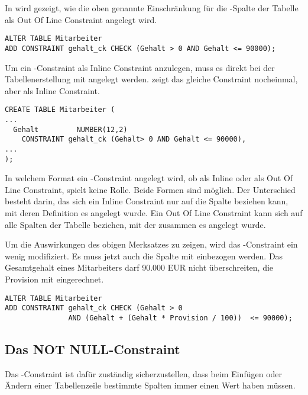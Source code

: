In  wird gezeigt, wie die oben genannte
Einschränkung für die -Spalte der Tabelle
 als Out Of Line Constraint angelegt wird.
\begin{lstlisting}[language=oracle_sql,caption={Ein \CHECK-Constraint als Out Of Line Constraint},label=sql09_02]
ALTER TABLE Mitarbeiter
ADD CONSTRAINT gehalt_ck CHECK (Gehalt > 0 AND Gehalt <= 90000);
        \end{lstlisting}
Um ein \CHECK-Constraint als Inline Constraint anzulegen, muss es direkt bei der Tabellenerstellung mit angelegt werden.  zeigt das gleiche Constraint nocheinmal, aber als Inline Constraint.
\begin{lstlisting}[language=oracle_sql,caption={Ein \CHECK-Constraint als Inline Constraint},label=sql09_03]
CREATE TABLE Mitarbeiter (
...
  Gehalt         NUMBER(12,2)
    CONSTRAINT gehalt_ck (Gehalt> 0 AND Gehalt <= 90000),
...
);
        \end{lstlisting}
\begin{merke}
    In welchem Format ein \CHECK-Constraint angelegt wird, ob als Inline oder als Out Of Line Constraint, spielt keine Rolle. Beide Formen sind möglich. Der Unterschied besteht darin, das sich ein Inline Constraint nur auf die Spalte beziehen kann, mit deren Definition es angelegt wurde. Ein Out Of Line Constraint kann sich auf alle Spalten der Tabelle beziehen, mit der zusammen es angelegt wurde.
\end{merke}
Um die Auswirkungen des obigen Merksatzes zu zeigen, wird das -Constraint ein wenig modifiziert. Es muss jetzt auch die Spalte  mit einbezogen werden. Das Gesamtgehalt eines Mitarbeiters darf 90.000 EUR nicht überschreiten, die Provision mit eingerechnet.
\begin{lstlisting}[language=oracle_sql,caption={Ein komplexes \CHECK-Constraint},label=sql09_04]
ALTER TABLE Mitarbeiter
ADD CONSTRAINT gehalt_ck CHECK (Gehalt > 0
               AND (Gehalt + (Gehalt * Provision / 100))  <= 90000);
        \end{lstlisting}
\subsection{Das NOT NULL-Constraint}
Das \NOTNULL-Constraint ist dafür zuständig sicherzustellen, dass beim Einfügen oder Ändern einer Tabellenzeile bestimmte Spalten immer einen Wert haben müssen.

